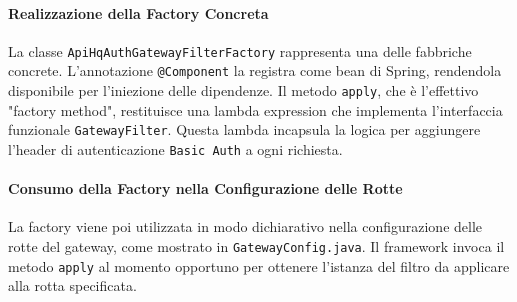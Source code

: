 \documentclass[12pt,a4paper,openright,twoside]{book}
\begin{document}
\paragraph{Realizzazione della Factory Concreta}
La classe \texttt{ApiHq\allowbreak Auth\allowbreak Gateway\allowbreak Filter\allowbreak Factory} rappresenta una delle fabbriche concrete. L'annotazione \texttt{@Component} la registra come bean di Spring, rendendola disponibile per l'iniezione delle dipendenze. Il metodo \texttt{apply}, che è l'effettivo "factory method", restituisce una lambda expression che implementa l'interfaccia funzionale \texttt{GatewayFilter}. Questa lambda incapsula la logica per aggiungere l'header di autenticazione \texttt{Basic Auth} a ogni richiesta.

%
%
%

\paragraph{Consumo della Factory nella Configurazione delle Rotte}
La factory viene poi utilizzata in modo dichiarativo nella configurazione delle rotte del gateway, come mostrato in \texttt{GatewayConfig.java}. Il framework invoca il metodo \texttt{apply} al momento opportuno per ottenere l'istanza del filtro da applicare alla rotta specificata.

\end{document}
